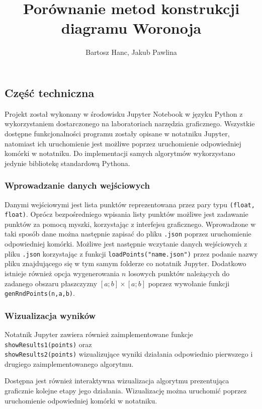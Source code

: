 \documentclass{myclass}
\title{Porównanie metod konstrukcji diagramu Woronoja}
\author{Bartosz Hanc, Jakub Pawlina}
\begin{document}
\maketitle
\tableofcontents

\subsection{Część techniczna}

Projekt został wykonany w środowisku Jupyter Notebook w języku Python z
wykorzystaniem dostarczonego na laboratoriach narzędzia graficznego. Wszystkie
dostępne funkcjonalności programu zostały opisane w notatniku Jupyter, natomiast
ich uruchomienie jest możliwe poprzez uruchomienie odpowiedniej komórki w
notatniku. Do implementacji samych algorytmów wykorzystano jedynie bibliotekę
standardową Pythona.

\subsubsection{Wprowadzanie danych wejściowych}

Danymi wejściowymi jest lista punktów reprezentowana przez pary typu
\texttt{(float, float)}. Oprócz bezpośredniego wpisania listy punktów możliwe
jest zadawanie punktów za pomocą myszki, korzystając z interfejsu graficznego.
Wprowadzone w taki sposób dane można następnie zapisać do pliku \texttt{.json}
poprzez uruchomienie odpowiedniej komórki. Możliwe jest następnie wczytanie
danych wejściowych z pliku \texttt{.json} korzystając z funkcji
\texttt{loadPoints("name.json")} przez podanie nazwy pliku znajdującego się w
tym samym folderze co notatnik Jupyter. Dodatkowo istnieje również opcja
wygenerowania \(n\) losowych punktów należących do zadanego obszaru płaszczyzny
\([a;b]\times[a;b]\) poprzez wywołanie funkcji
\texttt{genRndPoints(n,a,b)}.

\subsubsection{Wizualizacja wyników}

Notatnik Jupyter zawiera również zaimplementowane funkcje
\texttt{showResults1(points)} oraz \\ \texttt{showResults2(points)}
wizualizujące wyniki działania odpowiednio pierwszego i drugiego
zaimplementowanego algorytmu.

Dostępna jest również interaktywna wizualizacja algorytmu prezentująca
graficznie kolejne etapy jego działania. Wizualizację można uruchomić poprzez
uruchomienie odpowiedniej komórki w notatniku.
\end{document}
